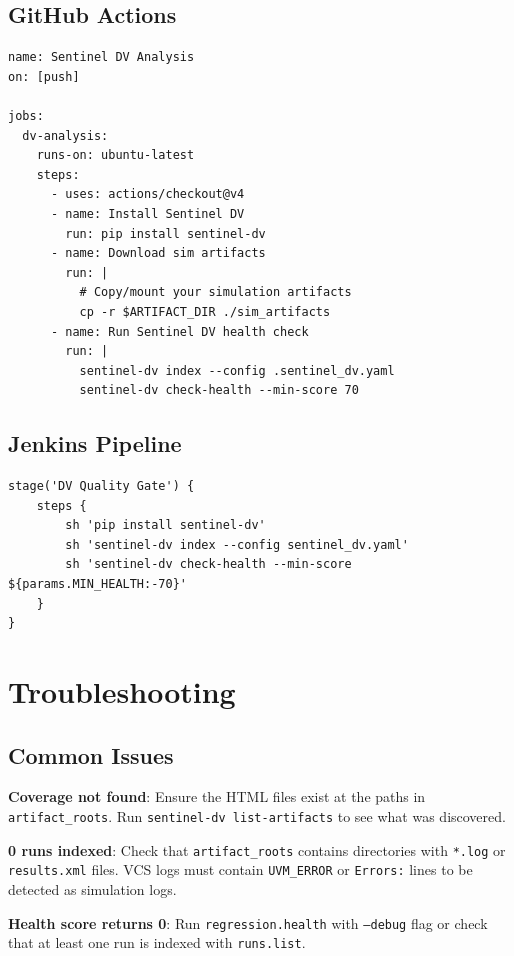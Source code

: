 \documentclass[11pt,a4paper]{article}
\begin{document}
\subsection{GitHub Actions}
\begin{lstlisting}[style=yaml,caption={.github/workflows/sentinel-dv.yml}]
name: Sentinel DV Analysis
on: [push]

jobs:
  dv-analysis:
    runs-on: ubuntu-latest
    steps:
      - uses: actions/checkout@v4
      - name: Install Sentinel DV
        run: pip install sentinel-dv
      - name: Download sim artifacts
        run: |
          # Copy/mount your simulation artifacts
          cp -r $ARTIFACT_DIR ./sim_artifacts
      - name: Run Sentinel DV health check
        run: |
          sentinel-dv index --config .sentinel_dv.yaml
          sentinel-dv check-health --min-score 70
\end{lstlisting}

\subsection{Jenkins Pipeline}
\begin{lstlisting}[style=yaml,caption={Jenkinsfile snippet}]
stage('DV Quality Gate') {
    steps {
        sh 'pip install sentinel-dv'
        sh 'sentinel-dv index --config sentinel_dv.yaml'
        sh 'sentinel-dv check-health --min-score ${params.MIN_HEALTH:-70}'
    }
}
\end{lstlisting}

\section{Troubleshooting}

\subsection{Common Issues}

\noindent\textbf{Coverage not found}: Ensure the HTML files exist at the paths in
\texttt{artifact\_roots}. Run \texttt{sentinel-dv list-artifacts} to see what
was discovered.

\noindent\textbf{0 runs indexed}: Check that \texttt{artifact\_roots} contains
directories with \texttt{*.log} or \texttt{results.xml} files. VCS logs must
contain \texttt{UVM\_ERROR} or \texttt{Errors:} lines to be detected as
simulation logs.

\noindent\textbf{Health score returns 0}: Run \texttt{regression.health} with
\texttt{--debug} flag or check that at least one run is indexed with
\texttt{runs.list}.
\end{document}
